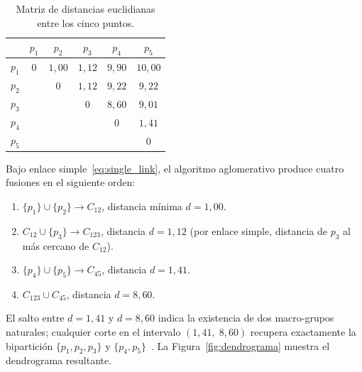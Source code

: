 \begin{table}[H]
\centering
\caption{Matriz de distancias euclidianas entre los cinco puntos.}
\label{tab:dist_jer}
\begin{tabular}{lccccc}
\toprule
 & $p_1$ & $p_2$ & $p_3$ & $p_4$ & $p_5$ \\
\midrule
$p_1$ & $0$ & $1{,}00$ & $1{,}12$ & $9{,}90$ & $10{,}00$ \\
$p_2$ &     & $0$      & $1{,}12$ & $9{,}22$ & $9{,}22$  \\
$p_3$ &     &          & $0$      & $8{,}60$ & $9{,}01$  \\
$p_4$ &     &          &          & $0$      & $1{,}41$  \\
$p_5$ &     &          &          &          & $0$       \\
\bottomrule
\end{tabular}
\end{table}

Bajo enlace simple~\eqref{eq:single_link}, el algoritmo aglomerativo produce cuatro fusiones en el siguiente orden:

\begin{enumerate}
\item $\{p_1\} \cup \{p_2\} \to C_{12}$, distancia mínima $d = 1{,}00$.
\item $C_{12} \cup \{p_3\} \to C_{123}$, distancia $d = 1{,}12$ (por enlace simple, distancia de $p_3$ al más cercano de $C_{12}$).
\item $\{p_4\} \cup \{p_5\} \to C_{45}$, distancia $d = 1{,}41$.
\item $C_{123} \cup C_{45}$, distancia $d = 8{,}60$.
\end{enumerate}

El salto entre $d = 1{,}41$ y $d = 8{,}60$ indica la existencia de dos macro-grupos naturales; cualquier corte en el intervalo $(1{,}41,\; 8{,}60)$ recupera exactamente la bipartición $\{p_1,p_2,p_3\}$ y $\{p_4,p_5\}$~\cite{jain1999clustering}. La Figura~\ref{fig:dendrograma} muestra el dendrograma resultante.

